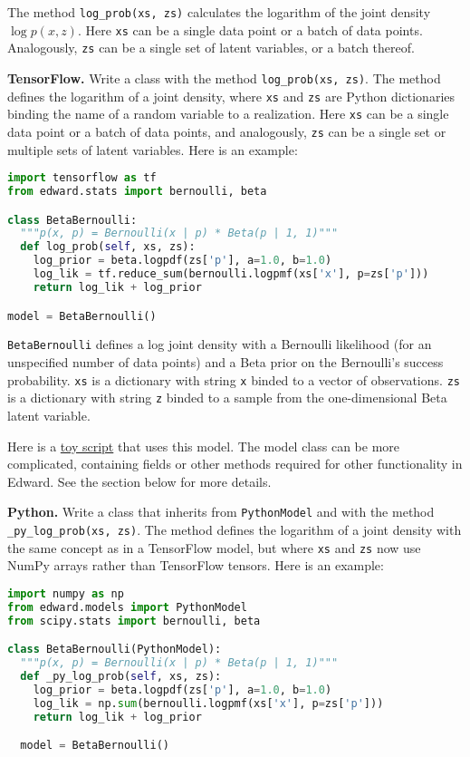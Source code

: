 The method \texttt{log_prob(xs, zs)} calculates the logarithm of
the joint density $\log p(x,z)$. Here \texttt{xs} can be a single data
point or a batch of data points. Analogously, \texttt{zs} can be a
single set of latent variables, or a batch thereof.

\textbf{TensorFlow.}
Write a class with the method \texttt{log_prob(xs, zs)}. The method defines
the logarithm of a joint density, where \texttt{xs} and \texttt{zs} are Python
dictionaries binding the name of a random variable to
a realization.
Here \texttt{xs} can be a single data
point or a batch of data points, and analogously, \texttt{zs} can be a
single set or multiple sets of latent variables.
Here is an example:

\begin{lstlisting}[language=Python]
import tensorflow as tf
from edward.stats import bernoulli, beta

class BetaBernoulli:
  """p(x, p) = Bernoulli(x | p) * Beta(p | 1, 1)"""
  def log_prob(self, xs, zs):
    log_prior = beta.logpdf(zs['p'], a=1.0, b=1.0)
    log_lik = tf.reduce_sum(bernoulli.logpmf(xs['x'], p=zs['p']))
    return log_lik + log_prior

model = BetaBernoulli()
\end{lstlisting}

\texttt{BetaBernoulli} defines a log joint density with a Bernoulli
likelihood (for an unspecified number of data points) and a Beta prior
on the Bernoulli's success probability.
\texttt{xs} is a dictionary with string \texttt{x} binded to a vector of
observations. \texttt{zs} is a dictionary with string \texttt{z} binded to a
sample from the one-dimensional Beta latent variable.

Here is a
\href{https://github.com/blei-lab/edward/blob/master/examples/tf_beta_bernoulli.py}
{toy script}
that uses this model. The model class can be more complicated,
containing fields or other methods required for other functionality in
Edward. See the section below for more details.

\textbf{Python.}
Write a class that inherits from \texttt{PythonModel} and with the method
\texttt{_py_log_prob(xs, zs)}. The method defines the logarithm of a joint
density with the same concept as in a TensorFlow model, but where
\texttt{xs} and \texttt{zs} now use NumPy arrays rather than TensorFlow tensors.
Here is an example:

\begin{lstlisting}[language=Python]
import numpy as np
from edward.models import PythonModel
from scipy.stats import bernoulli, beta

class BetaBernoulli(PythonModel):
  """p(x, p) = Bernoulli(x | p) * Beta(p | 1, 1)"""
  def _py_log_prob(self, xs, zs):
    log_prior = beta.logpdf(zs['p'], a=1.0, b=1.0)
    log_lik = np.sum(bernoulli.logpmf(xs['x'], p=zs['p']))
    return log_lik + log_prior

  model = BetaBernoulli()
\end{lstlisting}

